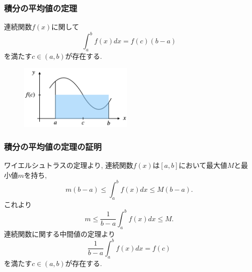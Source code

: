 

\begin{frame}
\frametitle{積分の平均値の定理}


\begin{Thm}[積分の平均値の定理]
連続関数$f(x)$に関して
$$
\int_a^b f(x)dx = f(c)(b-a)
$$
を満たす$c \in (a,b)$が存在する. 
\end{Thm}

\begin{figure}[htbp]
 \begin{center} 
  \includegraphics[width=55mm]{calculus12/MeanValueInt.png}
 \end{center}
\end{figure}

\end{frame}




\begin{frame}
\frametitle{積分の平均値の定理の証明}

ワイエルシュトラスの定理より, 連続関数$f(x)$は$[a,b]$において最大値$M$と最小値$m$を持ち, 
$$
m(b-a) \le \int_a^b f(x)dx \le M(b-a). 
$$
これより
$$
m \le \frac{1}{b-a}\int_a^b f(x)dx \le M.  
$$
連続関数に関する中間値の定理より
$$
\frac{1}{b-a}\int_a^b f(x)dx = f(c)
$$
を満たす$c \in (a,b)$が存在する. 


\end{frame}





